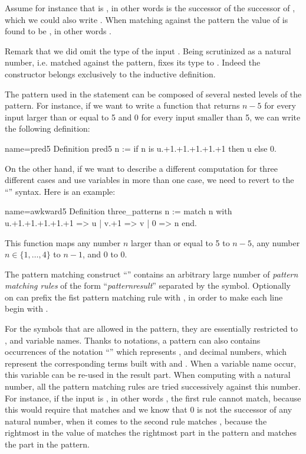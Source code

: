 Assume for instance that  is , in other words  is the
successor of the successor of , which we could also write
.  When matching  against the pattern 
the value of  is found to be , in other words .

Remark that we did omit the type of the input .  Being  scrutinized
as a natural number, i.e. matched against the  pattern, \Coq{} fixes its
type to .  Indeed the  constructor belongs exclusively to the
 inductive definition.

The pattern used in the  statement can be composed of
several nested levels of the  pattern.  For instance,
if we want to write a function
that returns \(n-5\) for every input larger than or equal to 5 and 0
for every input smaller than 5, we can write the following definition:

\begin{coq}{name=pred5}{}
Definition pred5 n :=
  if n is u.+1.+1.+1.+1.+1 then u else 0.
\end{coq}
On the other hand, if we want to describe a different computation for
three different cases and use variables in more than one case, we need
to revert to the ``'' syntax.  Here is an
example:

\begin{coq}{name=awkward5}{}
Definition three_patterns n :=
  match n with
    u.+1.+1.+1.+1.+1 => u
  | v.+1 => v
  | 0 => n
  end.
\end{coq}
This function maps any number \(n\) larger than or equal to 5 to \(n-5\),
any number \(n \in \{1, \ldots, 4\}\) to \(n-1\), and \(0\) to \(0\).

The pattern matching construct ``'' contains an
arbitrary large number of {\em pattern matching rules} of the form
``\emph{pattern}\C{ =>$~$}\emph{result}'' 
separated by the \C{|} symbol.  Optionally on can
prefix the fist pattern matching rule with \C{|}, in order to make each line
begin with \C{|}.

For the symbols that are allowed
in the pattern, they are essentially restricted to ,  and
variable names.  Thanks to notations, a pattern can also contains
occurrences of the notation ``'' which represents , and
decimal numbers, which represent the corresponding terms built with
 and .  When a variable name occur, this variable can be
re-used in the result part.  When computing with a natural number, all
the pattern matching rules are tried successively against this number.
For instance, if the input is , in other words , the first
rule cannot match, because this would require that  matches
 and we know that \(0\) is not the successor of any
natural number, when it comes to the second rule  matches
, because the rightmost  in the value of  matches
the rightmost  part in the pattern and  matches the  part
in the pattern.

